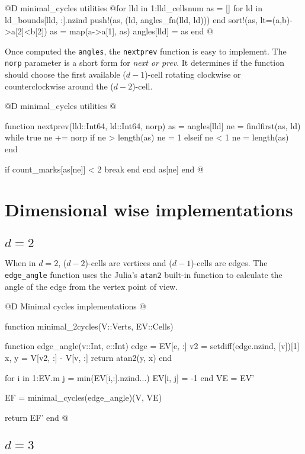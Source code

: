 @D minimal\_cycles utilities
@{for lld in 1:lld_cellsnum
    as = []
    for ld in ld_bounds[lld, :].nzind
        push!(as, (ld, angles_fn(lld, ld)))
    end
    sort!(as, lt=(a,b)->a[2]<b[2])
    as = map(a->a[1], as)
    angles[lld] = as
end
@}

Once computed the \texttt{angles}, the \texttt{nextprev} function is
easy to implement. The \texttt{norp} parameter is a short form for \textit{next or prev}. 
It determines if the function should choose the first available
($d-1$)-cell rotating clockwise or counterclockwise around the ($d-2$)-cell.

@D minimal\_cycles utilities
@{function nextprev(lld::Int64, ld::Int64, norp)
    as = angles[lld]
    ne = findfirst(as, ld)
    while true
        ne += norp
        if ne > length(as)
            ne = 1
        elseif ne < 1
            ne = length(as)
        end

        if count_marks[as[ne]] < 2
            break
        end
    end
    as[ne]
end
@}



\section{Dimensional wise implementations}
\label{sec:angles_fn}

\subsection{$d=2$}

When in $d=2$, ($d-2$)-cells are vertices and ($d-1$)-cells are edges.
The \texttt{edge\_angle} function uses the Julia's \texttt{atan2} 
built-in function to calculate the angle of the edge from the vertex point of view.

@D Minimal cycles implementations
@{function minimal_2cycles(V::Verts, EV::Cells)

    function edge_angle(v::Int, e::Int)
        edge = EV[e, :]
        v2 = setdiff(edge.nzind, [v])[1]
        x, y = V[v2, :] - V[v, :]
        return atan2(y, x)
    end

    for i in 1:EV.m
        j = min(EV[i,:].nzind...)
        EV[i, j] = -1
    end
    VE = EV'

    EF = minimal_cycles(edge_angle)(V, VE)

    return EF'
end
@}


\subsection{$d=3$}
\label{sec:3d_minimal_cycles}

